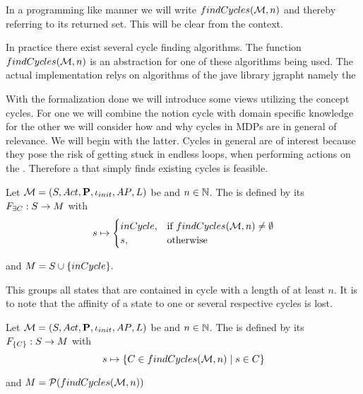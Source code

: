 \documentclass[preview]{standalone}
\begin{document}
In a programming like manner we will write ${findCycles}({{{\mathcal{M}}}},n)$ and thereby referring to its returned set. This will be clear from the context.

In practice there exist several cycle finding algorithms. The function ${findCycles}({{{\mathcal{M}}}}, n)$ is an abstraction for one of these algorithms being used. The actual implementation relys on algorithms of the jave library jgrapht namely the 

With the formalization done we will introduce some views utilizing the concept cycles. For one we will combine the notion cycle with domain specific knowledge for the other we will consider how and why cycles in MDPs are in general of relevance. We will begin with the latter.  Cycles in general are of interest because they pose the risk of getting stuck in endless loops, when performing actions on the \mdpN.  Therefore a \viewN that simply finds existing cycles is feasible.


\begin{definition}
	Let ${{{\mathcal{M}}}} = {{({S}, {Act}, {\textbf{P}}, {\iota_{init}}, {AP}, {L})}}$ be \chosengraphtypeN and $n \in {\mathbb{N}}$. The \viewN \viewhascycle is defined by its \grpfctN ${{F_{\exists{C}}}} : {S} \to {\ensuremath{{M}}}$ with
	\[
	{s} \mapsto
	\begin{cases}
		inCycle, &\text{if } {findCycles}({{{\mathcal{M}}}}, n) \neq \emptyset \\
		{{s}}, &\text{otherwise}
	\end{cases}
	\]
	
	and ${{M}} = {{S}} \cup \{inCycle\}.$
\end{definition}

This \viewN groups all states that are contained in cycle with a length of at least $n$. It is to note that the affinity of a state to one or several respective cycles is lost.


\begin{definition}
	Let ${{{\mathcal{M}}}} = {{({S}, {Act}, {\textbf{P}}, {\iota_{init}}, {AP}, {L})}}$ be \chosengraphtypeN and $n \in {\mathbb{N}}$. The \viewN \viewexactcycle is defined by its \grpfctN ${{F_{\{{C}\}}}} : {S} \to {\ensuremath{{M}}}$ with
	\[
	{s} \mapsto \{{C} \in {findCycles}({{{\mathcal{M}}}}, n) \mid {s} \in {C}\}
	\]
	
	and ${{M}} = {\mathcal{P}({findCycles}({{{\mathcal{M}}}}, n))}$
	\label{def:exactcycleview}
\end{definition}
\end{document}
